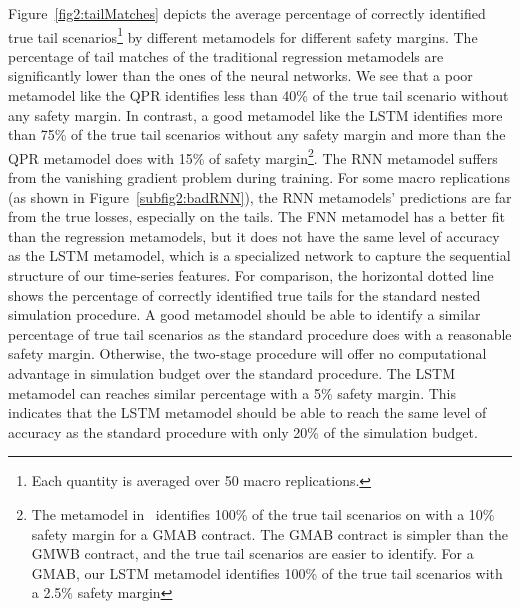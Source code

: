 Figure~\ref{fig2:tailMatches} depicts the average percentage of correctly identified true tail scenarios\footnote{Each quantity is averaged over 50 macro replications.}  by different metamodels for different safety margins.
The percentage of tail matches of the traditional regression metamodels are significantly lower than the ones of the neural networks.
We see that a poor metamodel like the QPR identifies less than 40\% of the true tail scenario without any safety margin.
In contrast, a good metamodel like the LSTM identifies more than 75\% of the true tail scenarios without any safety margin and more than the QPR metamodel does with 15\% of safety margin\footnote{The metamodel in~\cite{dang2020efficient} identifies 100\% of the true tail scenarios on with a 10\% safety margin for a GMAB contract.
The GMAB contract is simpler than the GMWB contract, and the true tail scenarios are easier to identify. 
For a GMAB, our LSTM metamodel identifies 100\% of the true tail scenarios with a 2.5\% safety margin}.
The RNN metamodel suffers from the vanishing gradient problem during training. 
For some macro replications (as shown in Figure~\ref{subfig2:badRNN}), the RNN metamodels' predictions are far from the true losses, especially on the tails.
The FNN metamodel has a better fit than the regression metamodels, but it does not have the same level of accuracy as the LSTM metamodel, which is a specialized network to capture the sequential structure of our time-series features.
For comparison, the horizontal dotted line shows the percentage of correctly identified true tails for the standard nested simulation procedure.
A good metamodel should be able to identify a similar percentage of true tail scenarios as the standard procedure does with a reasonable safety margin.
Otherwise, the two-stage procedure will offer no computational advantage in simulation budget over the standard procedure.
The LSTM metamodel can reaches similar percentage with a 5\% safety margin.
This indicates that the LSTM metamodel should be able to reach the same level of accuracy as the standard procedure with only 20\% of the simulation budget.

